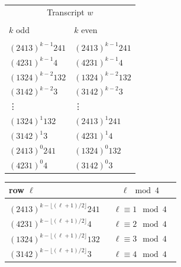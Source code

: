 \begin{figure}
	\begin{minipage}{.49\textwidth}
		\begin{tabular}{l|l}
			\multicolumn{2}{c}{Transcript $w$}\\
			\multicolumn{2}{c}{}  \\
			$k$ odd & \hspace{0.3cm} $k$ even\\\hline
			& \\
			$(2413)^{k-1}241$\hspace{0.3cm} & \hspace{0.3cm} $(2413)^{k-1}241$\\
			$(4231)^{k-1}4$   &  \hspace{0.3cm} $(4231)^{k-1}4$  \\
			$(1324)^{k-2}132$ &  \hspace{0.3cm} $(1324)^{k-2}132$\\
			$(3142)^{k-2}3$   &  \hspace{0.3cm} $(3142)^{k-2}3$ \\
			\vdots			 &  \hspace{0.3cm} \vdots\\
			$(1324)^1 132$	 &  \hspace{0.3cm} $(2413)^{1} 241$\\
			$(3142)^1 3$		 & \hspace{0.3cm} $(4231)^1 4$\\
			$(2413)^0 241$	 &  \hspace{0.3cm} $(1324)^0 132$\\
			$(4231)^0 4$		 & \hspace{0.3cm} $(3142)^0 3$\\
		\end{tabular}
	\end{minipage}
	\begin{minipage}{.49\textwidth}
		\begin{tabular}{|l|c|}
			\hline
			\hspace{1.2cm}row $\ell$ & $\ell\mod 4$ \\\hline
			 & \\
			\hspace{0.1cm}$(2413)^{k-\lfloor (\ell+1)/2\rfloor}241$ \hspace{0.1cm} &  $\textrm{ }\ell\equiv 1\mod 4\textrm{ }$\\
			\hspace{0.1cm}$(4231)^{k-\lfloor (\ell+1)/2\rfloor}4$   &  $\textrm{ }\ell\equiv 2 \mod 4\textrm{ }$ \\
			\hspace{0.1cm}$(1324)^{k-\lfloor (\ell+1)/2\rfloor}132$ &  $\textrm{ }\ell\equiv 3 \mod 4\textrm{ }$ \\
			\hspace{0.1cm}$(3142)^{k-\lfloor (\ell+1)/2\rfloor}3$   &  $\textrm{ }\ell\equiv 4 \mod 4\textrm{ }$ \\\hline
		\end{tabular}
	
	\end{minipage}
	
	
\end{figure}

